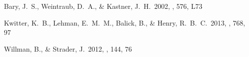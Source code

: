 \documentclass{knac}
\begin{document}
\begin{thebibliography}{}



Bary, J.~S., Weintraub, D.~A., \& Kastner, J.~H.\ 2002,  \apjl, 576,
L73

 Kwitter, K.~B., Lehman,
E.~M.~M., Balick, B., \& Henry, R.~B.~C.\ 2013, \apj, 768, 97

 Willman, B., \& Strader, J.\ 2012, \aj, 144, 76


\end{thebibliography}
\end{document}

